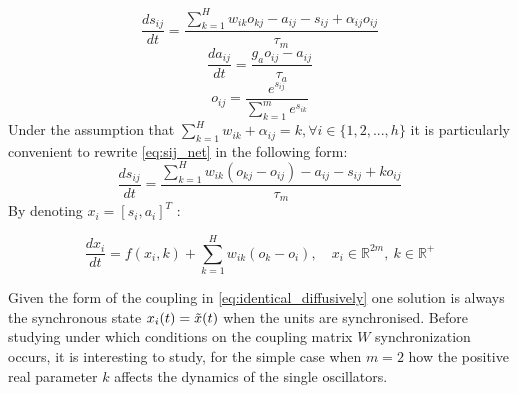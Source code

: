 \begin{equation}
    \frac{ds_{ij}}{dt} = \frac{\sum\limits_{k=1}^H w_{ik}o_{kj}-a_{ij}-s_{ij} + \alpha_{ij} o_{ij}}{\tau_m} 
    \label{eq:sij_net}
\end{equation}
\begin{equation}
    \frac{da_{ij}}{dt} = \frac{g_ao_{ij}-a_{ij}}{\tau_a} 
    \label{eq:aij_net}
\end{equation}
\begin{equation}
    o_{ij} = \frac{e^{s_{ij}}}{ \sum\limits_{k=1}^m e^{s_{ik}}}
    \label{eq:oij_net}
\end{equation}
Under the assumption that $\sum\limits_{k=1}^H w_{ik} + \alpha_{ij}=k, \forall i \in \{1, 2, ..., h\}$  it is particularly convenient to rewrite \cref{eq:sij_net} in the following form:
\begin{equation}
    \frac{ds_{ij}}{dt} = \frac{\sum\limits_{k=1}^H w_{ik}(o_{kj}-o_{ij})-a_{ij}-s_{ij} + k o_{ij}}{\tau_m} 
    \label{eq:sij_net_nice}
\end{equation}
By denoting $x_i=[s_i, a_i]^{T}$ :

\begin{equation}
    \frac{dx_i}{dt} = f(x_i,k) + \sum\limits_{k=1}^H w_{ik}(o_{k}-o_{i}),\quad x_i \in \mathbb{R}^{2m},\ k \in \mathbb{R}^+ 
    \label{eq:identical_diffusively}
\end{equation}

Given the form of the coupling in \cref{eq:identical_diffusively} one solution is always the synchronous state $x_i(t)=\Tilde{x}(t)$ when the units are synchronised. Before studying under which conditions on the coupling matrix $W$ synchronization occurs, it is interesting to study, for the simple case when $m=2$ how the positive real parameter $k$ affects the dynamics of the single oscillators.

